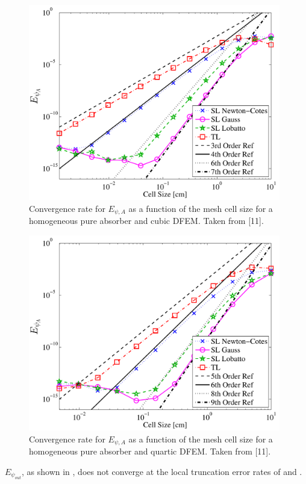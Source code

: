 \begin{figure}[!hbp]
\centering
\includegraphics[width=11cm]{chapter2_constant_xs/Cubic_L2A_err-eps-converted-to.pdf}
\caption{Convergence rate for $E_{\psi,A}$ as a function of the mesh cell size for a homogeneous pure absorber and cubic DFEM.  Taken from [11].}
\label{fig:multi_L2A_p3}
\end{figure}
\begin{figure}[!htp]
\centering
\includegraphics[width=11cm]{chapter2_constant_xs/Quartic_L2A_err-eps-converted-to.pdf}
\caption{Convergence rate for $E_{\psi,A}$ as a function of the mesh cell size for a homogeneous pure absorber and quartic DFEM.  Taken from [11].}
\label{fig:multi_L2A_p4}
\end{figure}
$E_{\psi_{out}}$, as shown in , does not converge at the local truncation error rates of  and .  
%

